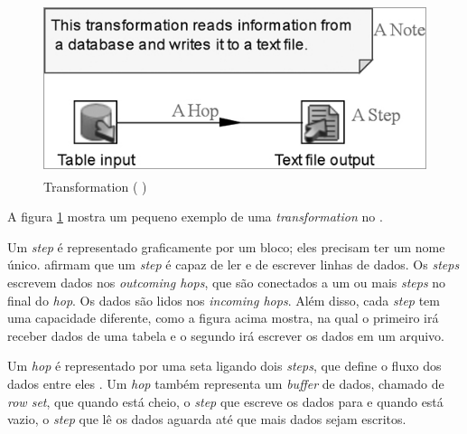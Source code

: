 \begin{figure}[H]
\centering
\includegraphics[height=5cm]{imagens/transformation.png}
\caption{Transformation (\citeauthor{kettle} \citeyear{kettle})}
\label{transformation}
\end{figure}

A figura \ref{transformation} mostra um pequeno exemplo de uma \textit{transformation} no \pdi.

Um \textit{step} é representado graficamente por um bloco; eles precisam ter um nome único.  afirmam que um \textit{step} é capaz de ler e de escrever linhas de dados. Os \textit{steps} escrevem dados nos \textit{outcoming hops}, que são conectados a um ou mais \textit{steps} no final do \textit{hop}. Os dados são lidos nos \textit{incoming hops}. Além disso, cada \textit{step} tem uma capacidade diferente, como a figura acima mostra, na qual o primeiro irá receber dados de uma tabela e o segundo irá escrever os dados em um arquivo.

Um \textit{hop} é representado por uma seta ligando dois \textit{steps}, que define o fluxo dos dados entre eles \citep{kettle}. Um \textit{hop} também representa um \textit{buffer} de dados, chamado de \textit{row set}, que quando está cheio, o \textit{step} que escreve os dados para e quando está vazio, o \textit{step} que lê os dados aguarda até que mais dados sejam escritos.

